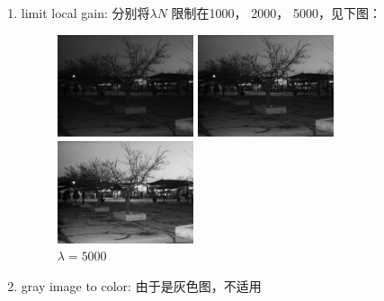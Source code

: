 \documentclass[a4paper,UTF8]{article}
\numberwithin{equation}{section}
\begin{document}
\begin{enumerate}[(\romannumeral1)]
	\item limit local gain: 分别将$\lambda N$ 限制在1000， 2000， 5000，见下图：
\begin{figure}[htbp]
\centering
\begin{minipage}[t]{0.30\textwidth}
\centering
\includegraphics[width=4cm]{night_limit_1000.png}
\caption{$\lambda=1000$}
\label{night:1000_lambda}
\end{minipage}
\centering
\begin{minipage}[t]{0.30\textwidth}
\centering
\includegraphics[width=4cm]{night_limit_2000.png}
\caption{$\lambda=2000$}
\label{night:2000_lambda}
\end{minipage}
\centering
\begin{minipage}[t]{0.30\textwidth}
\centering
\includegraphics[width=4cm]{night_limit_5000.png}
\caption{$\lambda=5000$}
\label{night:5000_lambda}
\end{minipage}
\end{figure}
	\item gray image to color: 由于是灰色图，不适用
\end{enumerate}
\end{document}
